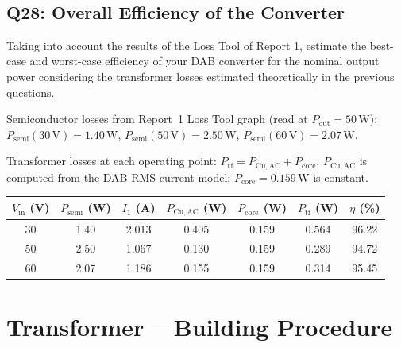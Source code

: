 \documentclass{PELsmallreport}
\begin{document}
\hfill{}\\








\subsection{Q28: Overall Efficiency of the Converter}  
Taking into account the results of the Loss Tool of Report 1, estimate the best-case and worst-case efficiency of your DAB converter for the nominal output power considering the transformer losses estimated theoretically in the previous questions. 

\begin{framed}
Semiconductor losses from Report~1 Loss Tool graph (read at $P_\mathrm{out}=50\,\mathrm{W}$): $P_\mathrm{semi}(30\,\mathrm{V})=1.40\,\mathrm{W}$, $P_\mathrm{semi}(50\,\mathrm{V})=2.50\,\mathrm{W}$, $P_\mathrm{semi}(60\,\mathrm{V})=2.07\,\mathrm{W}$.

Transformer losses at each operating point: $P_\mathrm{tf}=P_\mathrm{Cu,AC}+P_\mathrm{core}$. $P_\mathrm{Cu,AC}$ is computed from the DAB RMS current model; $P_\mathrm{core}=0.159\,\mathrm{W}$ is constant.

\begin{center}\begin{tabular}{ccccccc}\toprule
$V_\mathrm{in}$ (V) & $P_\mathrm{semi}$ (W) & $I_1$ (A) & $P_\mathrm{Cu,AC}$ (W) & $P_\mathrm{core}$ (W) & $P_\mathrm{tf}$ (W) & $\eta$ (\%) \\\midrule
30 & 1.40 & 2.013 & 0.405 & 0.159 & 0.564 & 96.22 \\
50 & 2.50 & 1.067 & 0.130 & 0.159 & 0.289 & 94.72 \\
60 & 2.07 & 1.186 & 0.155 & 0.159 & 0.314 & 95.45 \\\bottomrule
\end{tabular}\end{center}
\end{framed}

\qquad {} \hfill{}






\newpage
\section{Transformer -- Building Procedure}
\end{document}
